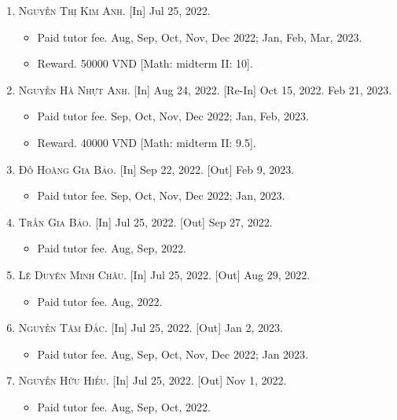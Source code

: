 \documentclass{article}
\begin{document}
\begin{enumerate}
	\item \textsc{Nguyễn Thị Kim Anh.} \textsf{[In]} Jul 25, 2022.
	\begin{itemize}
		\item \textsf{Paid tutor fee.} Aug, Sep, Oct, Nov, Dec 2022; Jan, Feb, Mar, 2023.
		\item \textsf{Reward.} 50000 VND [Math: midterm II: 10].
	\end{itemize}
	\item \textsc{Nguyễn Hà Nhựt Anh.} \textsf{[In]} Aug 24, 2022. \textsf{[Re-In]} Oct 15, 2022. Feb 21, 2023.
	\begin{itemize}
		\item \textsf{Paid tutor fee.} Sep, Oct, Nov, Dec 2022; Jan, Feb, 2023.
		\item \textsf{Reward.} 40000 VND [Math: midterm II: 9.5].
	\end{itemize}
	\item \textsc{Đỗ Hoàng Gia Bảo.} \textsf{[In]} Sep 22, 2022. \textsf{[Out]} Feb 9, 2023.
	\begin{itemize}
		\item \textsf{Paid tutor fee.} Sep, Oct, Nov, Dec 2022; Jan, 2023.
	\end{itemize}
	\item \textsc{Trần Gia Bảo.} \textsf{[In]} Jul 25, 2022. \textsf{[Out]} Sep 27, 2022.
	\begin{itemize}
		\item \textsf{Paid tutor fee.} Aug, Sep, 2022.
	\end{itemize}
	\item \textsc{Lê Duyên Minh Châu.} \textsf{[In]} Jul 25, 2022. \textsf{[Out]} Aug 29, 2022.
	\begin{itemize}
		\item \textsf{Paid tutor fee.} Aug, 2022.
	\end{itemize}
	\item \textsc{Nguyễn Tâm Đắc.} \textsf{[In]} Jul 25, 2022. \textsf{[Out]} Jan 2, 2023.
	\begin{itemize}
		\item \textsf{Paid tutor fee.} Aug, Sep, Oct, Nov, Dec 2022; Jan 2023.
	\end{itemize}
	\item \textsc{Nguyễn Hữu Hiếu.} \textsf{[In]} Jul 25, 2022. \textsf{[Out]} Nov 1, 2022.
	\begin{itemize}
		\item \textsf{Paid tutor fee.} Aug, Sep, Oct, 2022.

\end{itemize}
\end{enumerate}
\end{document}
